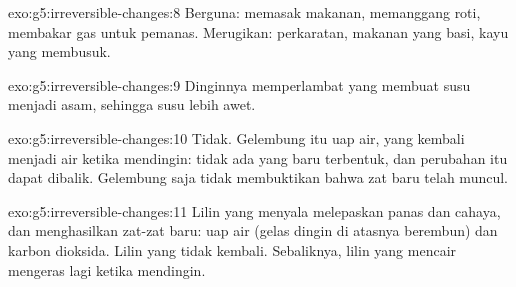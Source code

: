 \begin{solution}{exo:g5:irreversible-changes:8}
Berguna: memasak makanan, memanggang roti, membakar gas untuk pemanas.
Merugikan: perkaratan, makanan yang basi, kayu yang membusuk.
\end{solution}

\begin{solution}{exo:g5:irreversible-changes:9}
Dinginnya memperlambat  yang membuat susu menjadi asam,
sehingga susu lebih awet.
\end{solution}

\begin{solution}{exo:g5:irreversible-changes:10}
Tidak. Gelembung itu uap air, yang kembali menjadi air ketika mendingin:
tidak ada yang baru terbentuk, dan perubahan itu dapat dibalik.
Gelembung saja tidak membuktikan bahwa zat baru telah muncul.
\end{solution}

\begin{solution}{exo:g5:irreversible-changes:11}
Lilin yang menyala melepaskan panas dan cahaya, dan menghasilkan zat-zat
baru: uap air (gelas dingin di atasnya berembun) dan karbon dioksida.
Lilin yang  tidak kembali. Sebaliknya, lilin yang mencair
mengeras lagi ketika mendingin.
\end{solution}
